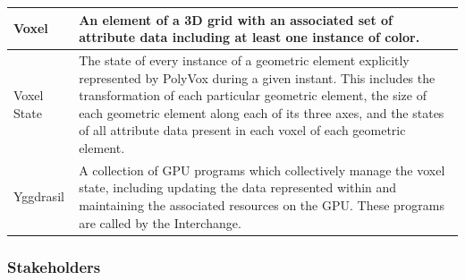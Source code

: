 \documentclass[onecolumn, draftclsnofoot,10pt, compsoc]{IEEEtran}
\begin{document}
\begin{longtable}{ | l | p{12cm} | }
Voxel & An element of a 3D grid with an associated set of attribute data including at least one instance of color.  \\ \hline
Voxel State & The state of every instance of a geometric element explicitly represented by PolyVox during a given instant. This includes the transformation of each particular geometric element, the size of each geometric element along each of its three axes, and the states of all attribute data present in each voxel of each geometric element. \\ \hline
Yggdrasil & A collection of GPU programs which collectively manage the voxel state, including updating the data represented within and maintaining the associated resources on the GPU. These programs are called by the Interchange. \\ \hline
\end{longtable}


\subsubsection{Stakeholders}
\end{document}
